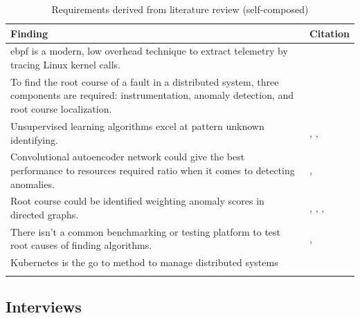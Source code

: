 \begin{longtable}{|p{105mm}|p{50mm}|}
    \hline
    \textbf{Finding} &
    \textbf{Citation} \\ \hline
    
    \ac{ebpf} is a modern, low overhead technique to extract telemetry by tracing Linux kernel calls. &
    \cite{LKMLIngo52:online} \\ \hline
    
    To find the root course of a fault in a distributed system, three components are required: instrumentation, anomaly detection, and root course localization. &
    \cite{wu2020microrca} \\ \hline
    
    Unsupervised learning algorithms excel at pattern unknown identifying. &
    \cite{silver2017mastering}, \cite{kumarage2018anomaly}, \cite{khoshnevisan2019rsm} \\ \hline
    Convolutional autoencoder network could give the best performance to resources required ratio when it comes to detecting anomalies. &
    \cite{zhang2019deep}, \cite{khoshnevisan2019rsm} \\ \hline
    
    Root course could be identified weighting anomaly scores in directed graphs. &
    \cite{samir2019dla}, \cite{wu2020microrca}, \cite{ma2020automap}, \cite{meng2020localizing} \\ \hline
    There isn’t a common benchmarking or testing platform to test root causes of finding algorithms. &
    \cite{wu2020microrca}, \cite{soldani2021anomaly} \\ \hline
    
    Kubernetes is the go to method to manage distributed systems &
    \cite{CloudNat36:online} \\ \hline

    \caption{Requirements derived from literature review (self-composed)}
    
\end{longtable}

\subsection{Interviews}

